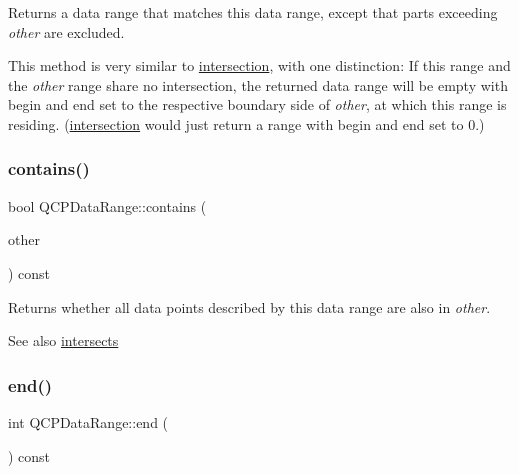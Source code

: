 Returns a data range that matches this data range, except that parts exceeding {\itshape other} are excluded.

This method is very similar to \hyperlink{class_q_c_p_data_range_a84e1e03129dd52528efb4bac18d30183}{intersection}, with one distinction\+: If this range and the {\itshape other} range share no intersection, the returned data range will be empty with begin and end set to the respective boundary side of {\itshape other}, at which this range is residing. (\hyperlink{class_q_c_p_data_range_a84e1e03129dd52528efb4bac18d30183}{intersection} would just return a range with begin and end set to 0.) \mbox{\label{class_q_c_p_data_range_a13ca398776374a3160aa85433718b812}} 
\subsubsection{\texorpdfstring{contains()}{contains()}}
{\footnotesize\ttfamily bool Q\+C\+P\+Data\+Range\+::contains (\begin{DoxyParamCaption}\item[{const \hyperlink{class_q_c_p_data_range}{Q\+C\+P\+Data\+Range} \&}]{other }\end{DoxyParamCaption}) const}

Returns whether all data points described by this data range are also in {\itshape other}.

\begin{DoxySeeAlso}{See also}
\hyperlink{class_q_c_p_data_range_a8a1c437f9beffd55621f48f961d7f679}{intersects} 
\end{DoxySeeAlso}
\mbox{\label{class_q_c_p_data_range_aee1b20fb045929c3753ee2ce14af7630}} 
\subsubsection{\texorpdfstring{end()}{end()}}
{\footnotesize\ttfamily int Q\+C\+P\+Data\+Range\+::end (\begin{DoxyParamCaption}{ }\end{DoxyParamCaption}) const\hspace{0.3cm}{\ttfamily [inline]}}

